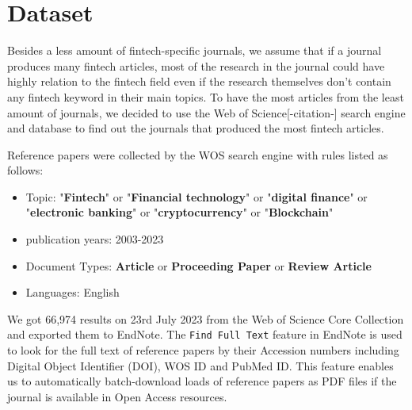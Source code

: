 \section{Dataset}
Besides a less amount of fintech-specific journals, we assume that if a journal produces many fintech articles, most of the research in the journal could have highly relation to the fintech field even if the research themselves don't contain any fintech keyword in their main topics.
To have the most articles from the least amount of journals, we decided to use the Web of Science[-citation-] search engine and database to find out the journals that produced the most fintech articles.



Reference papers were collected by the WOS search engine with rules listed as follows:
\begin{itemize}
    \item  Topic: "\textbf{Fintech}" or "\textbf{Financial technology}" or "\textbf{digital finance}" or "\textbf{electronic banking}" or "\textbf{cryptocurrency}" or "\textbf{Blockchain}"
    \item publication years: 2003-2023
    \item Document Types: \textbf{Article} or \textbf{Proceeding Paper} or \textbf{Review Article}
    \item Languages: English
\end{itemize}

We got 66,974 results on 23rd July 2023 from the Web of Science Core Collection and exported them to EndNote.
The \verb|Find Full Text| feature in EndNote is used to look for the full text of reference papers by their Accession numbers including Digital Object Identifier (DOI), WOS ID and PubMed ID.
This feature enables us to automatically batch-download loads of reference papers as PDF files if the journal is available in Open Access resources.

